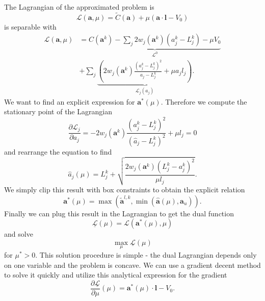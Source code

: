 The Lagrangian of the approximated problem is
\begin{equation}
    \mathcal{L}(\mathbf{a}, \mu) = \tilde{C}(\mathbf{a}) + \mu \left( \mathbf{a} \cdot \mathbf{l} - V_0 \right)
\end{equation}
is separable with 
\begin{equation}
    \begin{split}
        \mathcal{L}(\mathbf{a}, \mu) &= \underbrace{C(\mathbf{a}^k) - \sum_j 2w_j (\mathbf{a}^k) (a^k_j-L^k_j) - \mu V_0}_{\mathcal{L}^0} \\
        &+ \sum_j \underbrace{\left(2 w_j (\mathbf{a}^k)
        \frac{(a^k_j-L^k_j)^2}{a_j-L^k_j} + \mu a_j l_j \right)}_{\mathcal{L}_j (a_j)}.
    \end{split}
\end{equation}
We want to find an explicit expression for $\mathbf{a}^*(\mu)$. Therefore we compute the stationary point of the Lagrangian
\begin{equation}
    \frac{\partial \mathcal{L}_j}{\partial a_j} = -2 w_j (\mathbf{a}^k)
    \frac{(a^k_j-L^k_j)^2}{(\hat{a}_j-L^k_j)^2} + \mu l_j = 0
\end{equation}
and rearrange the equation to find 
\begin{equation}
    \hat{a}_j(\mu) = L_j^k + \sqrt{\frac{2 w_j (\mathbf{a}^k)
    (L^k_j-a^k_j)^2}{\mu l_j}}. 
\end{equation}
We simply clip this result with box constraints to obtain the explicit relation 
\begin{equation}
    \mathbf{a}^* (\mu) = \max\left(\tilde{\mathbf{a}}^{l,k}, \min \left(\hat{\mathbf{a}}(\mu), \mathbf{a}_u \right)\right). 
\end{equation}
Finally we can plug this result in the Lagrangian to get the dual function
\begin{equation}
    \underline{\mathcal{L}}(\mu) = \mathcal{L}(\mathbf{a}^* (\mu), \mu)
\end{equation}
and solve 
\begin{equation}
    \max_{\mu} \underline{\mathcal{L}}(\mu)
\end{equation}
for $\mu^*>0$. This solution procedure is simple - the dual Lagrangian depends only on one variable and the problem is concave. We can use a gradient decent method to solve it quickly and utilize this analytical expression for the gradient 
\begin{equation}
    \frac{\partial \underline{\mathcal{L}}}{\partial \mu}(\mu) =  \mathbf{a}^* (\mu) \cdot \mathbf{l} - V_0.
\end{equation}


